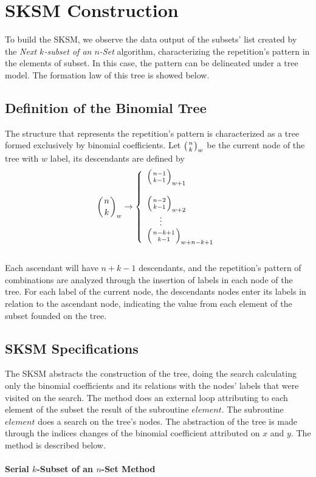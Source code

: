 \documentclass {amsart}
\begin{document}
\section*{SKSM Construction}

To build the SKSM, we observe the data output of the subsets' list
created by the \emph{Next {$k$}-subset of an {$n$}-Set} algorithm,
characterizing the repetition's pattern in the elements of subset.
In this case, the pattern can be delineated under a tree model.
The formation law of this tree is showed below.

\subsection*{Definition of the Binomial Tree}

The structure that represents the repetition's pattern is
characterized as a tree formed exclusively
by binomial coefficients.
Let {$\big({n\atop k}\big)_{w}$} be the current node of the tree
with {$w$} label, its descendants are defined by
\begin{equation}
\bigg({n\atop k}\bigg)_{w} \rightarrow \left\{
\begin{array}{l}
\Big({n-1\atop k-1}\Big)_{w+1}\\
\\
\Big({n-2\atop k-1}\Big)_{w+2}\\
\indent \vdots \\
\Big({n-k+1\atop k-1}\Big)_{w + n - k + 1}\\
\end{array} \right.
\end{equation}\\

Each ascendant will have {$n + k -1$} descendants, and the
repetition's pattern of combinations are analyzed through the
insertion of labels in each node of the tree. For each label of
the current node, the descendants nodes enter its labels in
relation to the ascendant node, indicating the value from each
element of the subset founded on the tree.

\subsection*{SKSM Specifications}

The SKSM abstracts the construction of the tree, doing the search
calculating only the binomial coefficients and its relations with
the nodes' labels that were visited on the search. The method does
an external loop attributing to each element of the subset the
result of the subroutine {$element$}. The subroutine {$element$}
does a search on the tree's nodes. The abstraction of the tree is
made through the indices changes of the binomial coefficient
attributed on {$x$} and {$y$}. The method is described below.\\\\
\textbf{Serial {$k$}-Subset of an {$n$}-Set Method}
\end{document}
